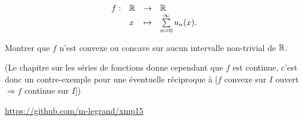 \documentclass[12pt,a4paper]{report}
\begin{document}
$$\begin{array}{llll}
f : & \mathbb{R} & \rightarrow & \mathbb{R}\\
& x & \mapsto & \sum\limits_{n=0}^\infty u_n(x).
\end{array}$$

Montrer que $f$ n'est convexe ou concave sur aucun intervalle non-trivial de $\mathbb{R}$.

(Le chapitre sur les séries de fonctions donne cependant que $f$ est continue, c'est donc un contre-exemple pour une éventuelle réciproque à $[f$ convexe sur $I$ ouvert $\Rightarrow f$ continue sur $I]$)

\vfill

\begin{center}
\url{https://github.com/m-legrand/xmp15}
\end{center}
\end{document}
